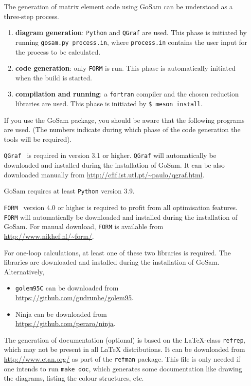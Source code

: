 \documentclass[11pt,a4paper]{refrep}
\newcommand{\gosamversion}{{3{.}0}}
\newcommand{\gosam}{{\sc GoSam}\xspace}
\newcommand{\gosamv}[1][\gosamversion]{{\sc GoSam}\xspace}
\newcommand{\golemVC}{{\tt golem95C}\xspace}
\newcommand{\qgraf}{{\tt QGraf}\xspace}
\newcommand{\form}{{\tt FORM}\xspace}
\newcommand{\python}{{\tt Python}\xspace}
\newcommand{\ninja}{{\sc Ninja}\xspace}
\begin{document}
The generation of matrix element code using \gosamv can be understood
as a three-step process. 
\begin{enumerate}
\item  {\bf diagram generation}: \python
and \qgraf are used. This phase is initiated by
running \texttt{gosam.py process.in}, where {\tt process.in} contains the 
user input for the process to be calculated.
\item {\bf code generation}: only \form is run.
This phase is automatically initiated when the build is started.
\item {\bf compilation and running}: 
a {\tt fortran} compiler and the chosen reduction libraries are used.
This phase is initiated
by  \texttt{\$ meson install}.
\end{enumerate}

If you use the \gosamv package, you should be aware that
the following programs are used.
(The numbers indicate during which phase of the code generation
the tools will be required).

\marginlabel{\qgraf (1)} \qgraf~\cite{Nogueira:1991ex}
is required in version 3{.}1 or
higher. 
\qgraf will automatically be downloaded and installed during the installation of \gosam.
It can be also downloaded manually from
\url{http://cfif.ist.utl.pt/~paulo/qgraf.html}.

\marginlabel{\python (1)} \gosam requires at least {\tt Python} version 3{.}9.

\marginlabel{\form (2)}  \form~\cite{Vermaseren:2000nd,Kuipers:2012rf}
version 4{.}0 or higher is required to profit from all optimisation features.
\form will automatically be downloaded and installed during the installation of \gosam.
For manual download, \form is available from
\url{http://www.nikhef.nl/~form/}.

\marginlabel{\ninja/\golemVC (3)}
For one-loop calculations, at least one of these two libraries is
required.
The libraries are downloaded and installed during the installation of \gosam.
Alternatively, 
\begin{itemize}
\item \golemVC can be downloaded from\\
\url{https://github.com/gudrunhe/golem95}.
\item \ninja can be downloaded from\\
\url{https://github.com/peraro/ninja}.
\end{itemize}

 The generation of documentation (optional)
is based on the \LaTeX-class \texttt{refrep}, which may not be
present in all \LaTeX{}
distributions. It can be downloaded from \url{http://www.ctan.org/}
as part of the \texttt{refman} package.
This file is only needed if one intends to run \texttt{make doc},
which generates some documentation like drawing the diagrams, 
listing the colour structures, etc.
\end{document}
